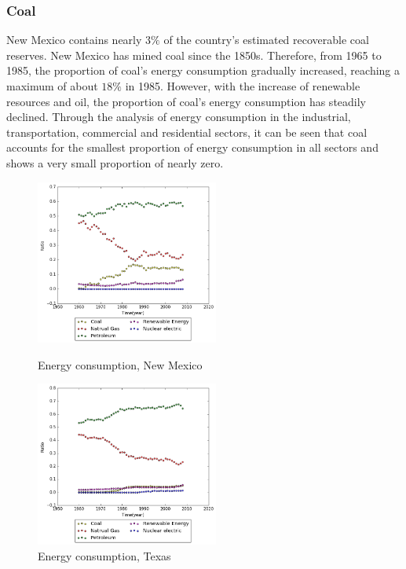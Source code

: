 \documentclass{mcmthesis}
\begin{document}
\subsubsection{Coal}
  New Mexico contains nearly $3\%$ of the country's estimated recoverable coal reserves. New Mexico has mined coal since the 1850s.
  Therefore, from 1965 to 1985, the proportion of coal's energy consumption gradually increased, reaching a maximum of about $18\%$ in 1985.
  However, with the increase of renewable resources and oil, the proportion of coal's energy consumption has steadily declined.
  Through the analysis of energy consumption in the industrial, transportation, commercial and residential sectors,
  it can be seen that coal accounts for the smallest proportion of energy consumption in all sectors and shows a very small proportion of nearly zero.
  \begin{figure}[htbp]
  \centering
  \begin{minipage}[t]{0.48\textwidth}
  \centering
  \includegraphics[width=6cm]{energyprofile_nm.png}
  \caption{Energy consumption, New Mexico}
  \end{minipage}
  \begin{minipage}[t]{0.48\textwidth}
  \centering
  \includegraphics[width=6cm]{energyprofile_tx.png}
  \caption{Energy consumption, Texas}
  \end{minipage}
  \end{figure}
\end{document}
